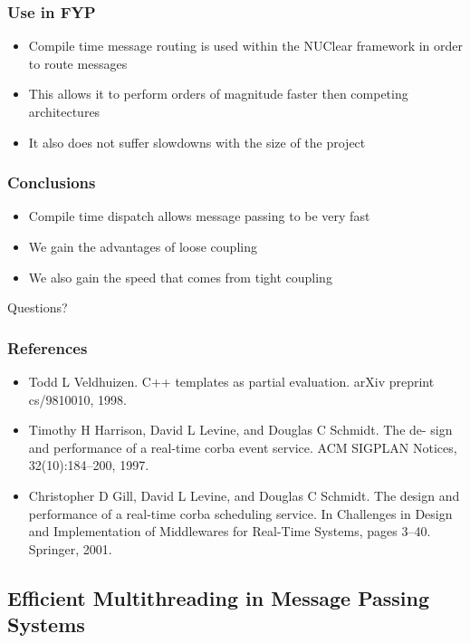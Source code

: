 \documentclass{beamer}
\begin{document}
	\begin{frame}
		\frametitle{Use in FYP}
		\begin{itemize}
			\item Compile time message routing is used within the NUClear framework in order to route messages
			\item This allows it to perform orders of magnitude faster then competing architectures
			\item It also does not suffer slowdowns with the size of the project
		\end{itemize}
	\end{frame}
	
	\begin{frame}
		\frametitle{Conclusions}
		\begin{itemize}
			\item Compile time dispatch allows message passing to be very fast
			\item We gain the advantages of loose coupling
			\item We also gain the speed that comes from tight coupling
		\end{itemize}
	\end{frame}
	
	\begin{frame}
		\huge Questions?
	\end{frame}
	
	\begin{frame}
		\frametitle{References}
		\begin{itemize}
			\item Todd L Veldhuizen. C++ templates as partial evaluation. arXiv preprint cs/9810010, 1998.	\item Timothy H Harrison, David L Levine, and Douglas C Schmidt. The de- sign and performance of a real-time corba event service. ACM SIGPLAN Notices, 32(10):184–200, 1997.
			\item Christopher D Gill, David L Levine, and Douglas C Schmidt. The design and performance of a real-time corba scheduling service. In Challenges in Design and Implementation of Middlewares for Real-Time Systems, pages 3–40. Springer, 2001.
		\end{itemize}
	\end{frame}
	
	\subsection{Efficient Multithreading in Message Passing Systems}
	\begin{frame}
		\subsectionpage
	\end{frame}
	
\end{document}
